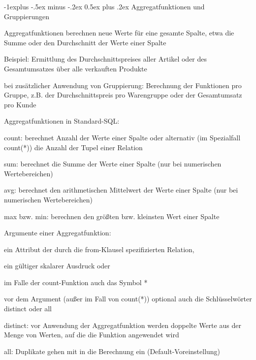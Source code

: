 \documentclass[a4paper]{article}
\makeatletter
\renewcommand{\subsection}{\@startsection{subsection}{2}{0mm}%
                                {-1explus -.5ex minus -.2ex}%
                                {0.5ex plus .2ex}%
                                {\normalfont\normalsize\bfseries}}
\makeatother
\begin{document}
\begin{multicols}{3}
\subsection{Aggregatfunktionen und Gruppierungen}
\begin{itemize*}
    \item Aggregatfunktionen berechnen neue Werte für eine gesamte Spalte, etwa die Summe oder den Durchschnitt der Werte einer Spalte
    \item Beispiel: Ermittlung des Durchschnittspreises aller Artikel oder des Gesamtumsatzes über alle verkauften Produkte
    \item bei zusätzlicher Anwendung von Gruppierung: Berechnung der Funktionen pro Gruppe, z.B. der Durchschnittspreis pro Warengruppe oder der Gesamtumsatz pro Kunde
    \item Aggregatfunktionen in Standard-SQL:
    \begin{itemize*}
        \item count: berechnet Anzahl der Werte einer Spalte oder alternativ (im Spezialfall count(*)) die Anzahl der Tupel einer Relation
        \item sum: berechnet die Summe der Werte einer Spalte (nur bei numerischen Wertebereichen)
        \item avg: berechnet den arithmetischen Mittelwert der Werte einer Spalte (nur bei numerischen Wertebereichen)
        \item max bzw. min: berechnen den größten bzw. kleinsten Wert einer Spalte
    \end{itemize*}
    \item Argumente einer Aggregatfunktion:
    \begin{itemize*}
        \item ein Attribut der durch die from-Klausel spezifizierten Relation,
        \item ein gültiger skalarer Ausdruck oder
        \item im Falle der count-Funktion auch das Symbol *
    \end{itemize*}
    \item vor dem Argument (außer im Fall von count(*)) optional auch die Schlüsselwörter distinct oder all
    \begin{itemize*}
        \item distinct: vor Anwendung der Aggregatfunktion werden doppelte Werte aus der Menge von Werten, auf die die Funktion angewendet wird
        \item all: Duplikate gehen mit in die Berechnung ein (Default-Voreinstellung)

\end{itemize*}
\end{itemize*}
\end{multicols}
\end{document}
